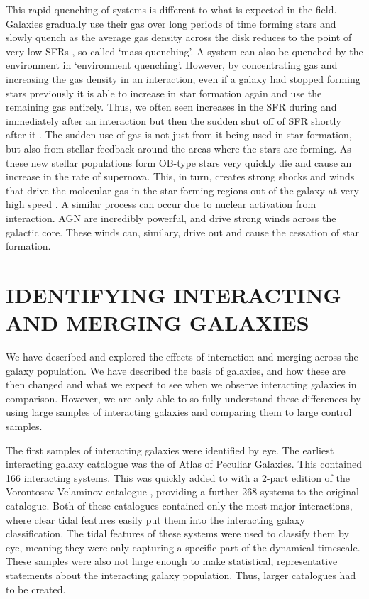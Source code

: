 This rapid quenching of systems is different to what is expected in the field. Galaxies gradually use their gas over long periods of time forming stars and slowly quench as the average gas density across the disk reduces to the point of very low SFRs \citep{2010ApJ...721..193P}, so-called `mass quenching'. A system can also be quenched by the environment in `environment quenching'. However, by concentrating gas and increasing the gas density in an interaction, even if a galaxy had stopped forming stars previously it is able to increase in star formation again and use the remaining gas entirely. Thus, we often seen increases in the SFR during and immediately after an interaction but then the sudden shut off of SFR shortly after it \citep{2022MNRAS.517L..92E}. The sudden use of gas is not just from it being used in star formation, but also from stellar feedback around the areas where the stars are forming. As these new stellar populations form OB-type stars very quickly die and cause an increase in the rate of supernova. This, in turn, creates strong shocks and winds that drive the molecular gas in the star forming regions out of the galaxy at very high speed \citep{2013Natur.499..450B, 2018ApJ...864L...1G}. A similar process can occur due to nuclear activation from interaction. AGN are incredibly powerful, and drive strong winds across the galactic core. These winds can, similary, drive out \citep{2014A&A...562A..21C,  	2016Natur.533..504C, 2018MNRAS.480.3993B} and cause the cessation of star formation.

\section{IDENTIFYING INTERACTING AND MERGING GALAXIES}
\noindent We have described and explored the effects of interaction and merging across the galaxy population. We have described the basis of galaxies, and how these are then changed and what we expect to see when we observe interacting galaxies in comparison. However, we are only able to so fully understand these differences by using large samples of interacting galaxies and comparing them to large control samples.

The first samples of interacting galaxies were identified by eye. The earliest interacting galaxy catalogue was the \citet{1966ApJS...14....1A} of Atlas of Peculiar Galaxies. This contained 166 interacting systems. This was quickly added to with a 2-part edition of the Vorontosov-Velaminov catalogue \citep{1977A&AS...28....1V}, providing a further 268 systems to the original \citet{1966ApJS...14....1A} catalogue. Both of these catalogues contained only the most major interactions, where clear tidal features easily put them into the interacting galaxy classification. The tidal features of these systems were used to classify them by eye, meaning they were only capturing a specific part of the dynamical timescale. These samples were also not large enough to make statistical, representative statements about the interacting galaxy population. Thus, larger catalogues had to be created.

